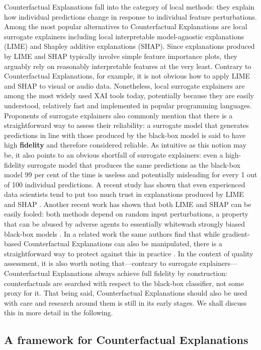 \documentclass[
  letterpaper,
  DIV=11,
  numbers=noendperiod]{scrartcl}
\begin{document}
Counterfactual Explanations fall into the category of local methods:
they explain how individual predictions change in response to individual
feature perturbations. Among the most popular alternatives to
Counterfactual Explanations are local surrogate explainers including
local interpretable model-agnostic explanations (LIME) and Shapley
additive explanations (SHAP). Since explanations produced by LIME and
SHAP typically involve simple feature importance plots, they arguably
rely on reasonably interpretable features at the very least. Contrary to
Counterfactual Explanations, for example, it is not obvious how to apply
LIME and SHAP to visual or audio data. Nonetheless, local surrogate
explainers are among the most widely used XAI tools today, potentially
because they are easily understood, relatively fast and implemented in
popular programming languages. Proponents of surrogate explainers also
commonly mention that there is a straightforward way to assess their
reliability: a surrogate model that generates predictions in line with
those produced by the black-box model is said to have high
\textbf{fidelity} and therefore considered reliable. As intuitive as
this notion may be, it also points to an obvious shortfall of surrogate
explainers: even a high-fidelity surrogate model that produces the same
predictions as the black-box model 99 per cent of the time is useless
and potentially misleading for every 1 out of 100 individual
predictions. A recent study has shown that even experienced data
scientists tend to put too much trust in explanations produced by LIME
and SHAP \cite{kaur2020interpreting}. Another recent work has shown that
both LIME and SHAP can be easily fooled: both methods depend on random
input perturbations, a property that can be abused by adverse agents to
essentially whitewash strongly biased black-box models
\cite{slack2020fooling}. In a related work the same authors find that
while gradient-based Counterfactual Explanations can also be
manipulated, there is a straightforward way to protect against this in
practice \cite{slack2021counterfactual}. In the context of quality
assessment, it is also worth noting that---contrary to surrogate
explainers---Counterfactual Explanations always achieve full fidelity by
construction: counterfactuals are searched with respect to the black-box
classifier, not some proxy for it. That being said, Counterfactual
Explanations should also be used with care and research around them is
still in its early stages. We shall discuss this in more detail in the
following.

\hypertarget{sec-method}{%
\subsection{A framework for Counterfactual
Explanations}\label{sec-method}}
\end{document}
